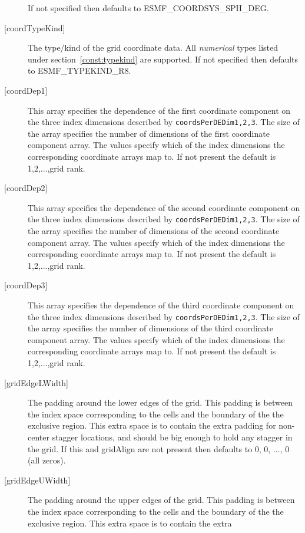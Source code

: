 \begin{description}
       If not specified then defaults to ESMF\_COORDSYS\_SPH\_DEG.
   \item[{[coordTypeKind]}]
       The type/kind of the grid coordinate data. All {\em numerical} types
       listed under section~\ref{const:typekind} are supported.
       If not specified then defaults to ESMF\_TYPEKIND\_R8.
   \item[{[coordDep1]}]
       This array specifies the dependence of the first
       coordinate component on the three index dimensions
       described by {\tt coordsPerDEDim1,2,3}. The size of the
       array specifies the number of dimensions of the first
       coordinate component array. The values specify which
       of the index dimensions the corresponding coordinate
       arrays map to. If not present the default is 1,2,...,grid rank.
   \item[{[coordDep2]}]
       This array specifies the dependence of the second
       coordinate component on the three index dimensions
       described by {\tt coordsPerDEDim1,2,3}. The size of the
       array specifies the number of dimensions of the second
       coordinate component array. The values specify which
       of the index dimensions the corresponding coordinate
       arrays map to. If not present the default is 1,2,...,grid rank.
   \item[{[coordDep3]}]
       This array specifies the dependence of the third
       coordinate component on the three index dimensions
       described by {\tt coordsPerDEDim1,2,3}. The size of the
       array specifies the number of dimensions of the third
       coordinate component array. The values specify which
       of the index dimensions the corresponding coordinate
       arrays map to. If not present the default is 1,2,...,grid rank.
   \item[{[gridEdgeLWidth]}]
        The padding around the lower edges of the grid. This padding is between
        the index space corresponding to the cells and the boundary of the
        the exclusive region. This extra space is to contain the extra
        padding for non-center stagger locations, and should be big enough
        to hold any stagger in the grid. If this and gridAlign are not present then
        defaults to 0, 0, ..., 0 (all zeros).
   \item[{[gridEdgeUWidth]}]
        The padding around the upper edges of the grid. This padding is between
        the index space corresponding to the cells and the boundary of the
        the exclusive region. This extra space is to contain the extra

\end{description}

